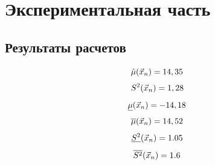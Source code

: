 \documentclass[12pt]{report}
\begin{document}
\begin{figure}[ht!]	\end{figure}

\chapter{Экспериментальная часть}

\section{Результаты расчетов}

\begin{equation*}
    \hat\mu(\vec x_n) = 14,35\\
\end{equation*}
\begin{equation*}
    S^2(\vec x_n) = 1,28\\
\end{equation*}
\begin{equation*}
    \underline\mu(\vec x_n) = -14,18\\
\end{equation*}
\begin{equation*}
    \overline\mu(\vec x_n) = 14,52\\
\end{equation*}
\begin{equation*}
    \underline{S^2}(\vec x_n) = 1.05\\
\end{equation*}
\begin{equation*}
    \overline{S^2}(\vec x_n) = 1.6\\
\end{equation*}

\begin{figure}[ht!]	
\end{figure}
\end{document}
